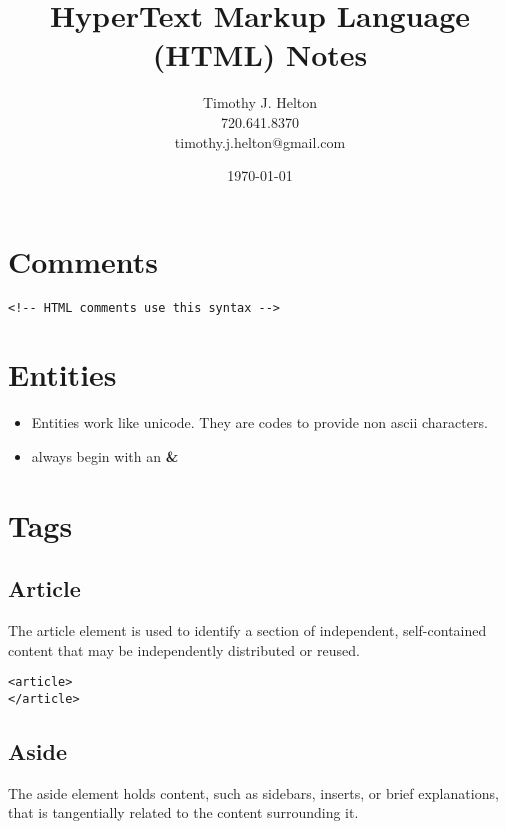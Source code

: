 \documentclass{article}
\newcommand{\mytitle}{HyperText Markup Language (HTML) Notes}
\begin{document}
\author{Timothy J. Helton\\720.641.8370\\timothy.j.helton@gmail.com}
\date{\today}
\title{\mytitle}

\maketitle
\newpage

\tableofcontents
\newpage

\listoffigures
\listoftables
\newpage


\section{Comments}

\begin{lstlisting}
<!-- HTML comments use this syntax -->
\end{lstlisting}

\section{Entities}
\begin{itemize}
  \item Entities work like unicode. They are codes to provide non ascii
        characters.
  \item always begin with an \textbf{\&}
\end{itemize}

\section{Tags}

\subsection{Article}
The article element is used to identify a section of independent, self-contained
content that may be independently distributed or reused.

\begin{lstlisting}
<article>
</article>
\end{lstlisting}

\subsection{Aside}
The aside element holds content, such as sidebars, inserts, or brief
explanations, that is tangentially related to the content surrounding it.
\end{document}

